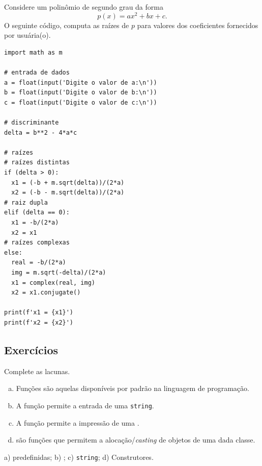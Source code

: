 \begin{ex}
  Considere um polinômio de segundo grau da forma
  \begin{equation}
    p(x) = ax^2 + bx + c.
  \end{equation}
  O seguinte código, computa as raízes de $p$ para valores dos coeficientes fornecidos por usuária(o).

\begin{lstlisting}
import math as m

# entrada de dados
a = float(input('Digite o valor de a:\n'))
b = float(input('Digite o valor de b:\n'))
c = float(input('Digite o valor de c:\n'))

# discriminante
delta = b**2 - 4*a*c

# raízes
# raízes distintas
if (delta > 0):
  x1 = (-b + m.sqrt(delta))/(2*a)
  x2 = (-b - m.sqrt(delta))/(2*a)
# raiz dupla
elif (delta == 0):
  x1 = -b/(2*a)
  x2 = x1
# raízes complexas
else:
  real = -b/(2*a)
  img = m.sqrt(-delta)/(2*a)
  x1 = complex(real, img)
  x2 = x1.conjugate()

print(f'x1 = {x1}')
print(f'x2 = {x2}')
\end{lstlisting}

\end{ex}

\subsection{Exercícios}


\begin{exer}
  Complete as lacunas.
  \begin{enumerate}[a)]
    \item Funções \underline{\phantom{predefinidas}} são aquelas disponíveis por padrão na linguagem de programação.
    \item A função \underline{\phantom{{\PYTHONinput}}} permite a entrada de uma \texttt{string}.
    \item A função {\PYTHONprint} permite a impressão de uma \underline{}.
    \item \underline{\phantom{Construtores}} são funções que permitem a alocação/\textit{casting} de objetos de uma dada classe.
  \end{enumerate}
\end{exer}
\begin{resp}
  a) predefinidas; b) {\PYTHONinput}; c) \texttt{string}; d) Construtores.
\end{resp}

